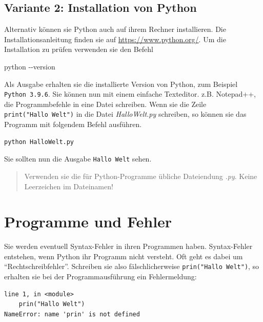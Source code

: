 \documentclass[
  oneside]{book}
\newenvironment{Shaded}{\begin{snugshade}}{\end{snugshade}}
\newcommand{\AttributeTok}[1]{\textcolor[rgb]{0.77,0.63,0.00}{#1}}
\newcommand{\ExtensionTok}[1]{#1}
\begin{document}
\hypertarget{variante-2-installation-von-python}{%
\subsection*{Variante 2: Installation von Python}\label{variante-2-installation-von-python}}

Alternativ können sie Python auch auf ihrem Rechner installieren. Die Installationsanleitung finden sie auf \url{https://www.python.org/}. Um die Installation zu prüfen verwenden sie den Befehl

\begin{Shaded}
\begin{Highlighting}[]
\ExtensionTok{python} \AttributeTok{{-}{-}version}    
\end{Highlighting}
\end{Shaded}

Als Ausgabe erhalten sie die installierte Version von Python, zum Beispiel \texttt{Python\ 3.9.6}. Sie können nun mit einem einfache Texteditor. z.B. Notepad++, die Programmbefehle in eine Datei schreiben. Wenn sie die Zeile \texttt{print("Hallo\ Welt")} in die Datei \emph{HalloWelt.py} schreiben, so können sie das Programm mit folgendem Befehl ausführen.

\begin{verbatim}
python HalloWelt.py
\end{verbatim}

Sie sollten nun die Ausgabe \texttt{Hallo\ Welt} sehen.

\begin{quote}
Verwenden sie die für Python-Programme übliche Dateiendung \emph{.py}. Keine Leerzeichen im Dateinamen!
\end{quote}

\hypertarget{programme-und-fehler}{%
\section{Programme und Fehler}\label{programme-und-fehler}}

Sie werden eventuell Syntax-Fehler in ihren Programmen haben. Syntax-Fehler entstehen, wenn Python ihr Programm nicht versteht. Oft geht es dabei um ``Rechtschreibfehler''. Schreiben sie also fälschlicherweise \texttt{prin("Hallo\ Welt")}, so erhalten sie bei der Programmausführung ein Fehlermeldung:

\begin{verbatim}
line 1, in <module>
    prin("Hallo Welt")
NameError: name 'prin' is not defined 
\end{verbatim}
\end{document}
